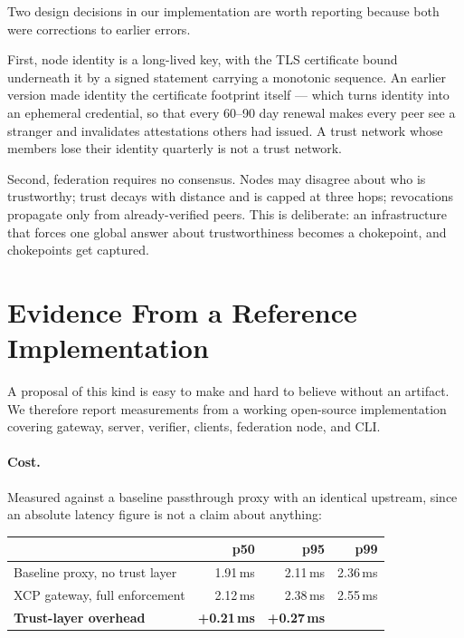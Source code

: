 \documentclass[11pt]{article}
\begin{document}
Two design decisions in our implementation are worth reporting because both were
corrections to earlier errors.

First, node identity is a long-lived key, with the TLS certificate bound
underneath it by a signed statement carrying a monotonic sequence. An earlier
version made identity the certificate footprint itself --- which turns identity
into an ephemeral credential, so that every 60--90 day renewal makes every peer
see a stranger and invalidates attestations others had issued. A trust network
whose members lose their identity quarterly is not a trust network.

Second, federation requires no consensus. Nodes may disagree about who is
trustworthy; trust decays with distance and is capped at three hops; revocations
propagate only from already-verified peers. This is deliberate: an infrastructure
that forces one global answer about trustworthiness becomes a chokepoint, and
chokepoints get captured.

\section{Evidence From a Reference Implementation}\label{sec:eval}

A proposal of this kind is easy to make and hard to believe without an artifact.
We therefore report measurements from a working open-source implementation
covering gateway, server, verifier, clients, federation node, and CLI.

\paragraph{Cost.} Measured against a baseline passthrough proxy with an identical
upstream, since an absolute latency figure is not a claim about anything:

\begin{center}
\small
\begin{tabular}{@{}lrrr@{}}
\toprule
& p50 & p95 & p99 \\
\midrule
Baseline proxy, no trust layer & 1.91\,ms & 2.11\,ms & 2.36\,ms \\
XCP gateway, full enforcement & 2.12\,ms & 2.38\,ms & 2.55\,ms \\
\textbf{Trust-layer overhead} & \textbf{+0.21\,ms} & \textbf{+0.27\,ms} & \\
\bottomrule
\end{tabular}
\end{center}
\end{document}

